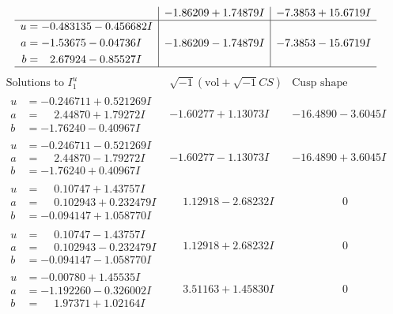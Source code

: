 \documentclass[1p]{elsarticle_modified}
\theoremstyle{definition}
\newcommand{\I}{\sqrt{-1}}
\begin{document}
$$\begin{array}{c|c|c}
 & -1.86209 + 1.74879 I & -7.3853 + 15.6719 I \\ \hline\begin{aligned}
u &= -0.483135 - 0.456682 I \\
a &= -1.53675 - 0.04736 I \\
b &= \phantom{-}2.67924 - 0.85527 I\end{aligned}
 & -1.86209 - 1.74879 I & -7.3853 - 15.6719 I\\
 \hline 
 \end{array}$$\newpage$$\begin{array}{c|c|c}  
\text{Solutions to }I^u_{1}& \I (\text{vol} + \sqrt{-1}CS) & \text{Cusp shape}\\
 \hline 
\begin{aligned}
u &= -0.246711 + 0.521269 I \\
a &= \phantom{-}2.44870 + 1.79272 I \\
b &= -1.76240 - 0.40967 I\end{aligned}
 & -1.60277 + 1.13073 I & -16.4890 - 3.6045 I \\ \hline\begin{aligned}
u &= -0.246711 - 0.521269 I \\
a &= \phantom{-}2.44870 - 1.79272 I \\
b &= -1.76240 + 0.40967 I\end{aligned}
 & -1.60277 - 1.13073 I & -16.4890 + 3.6045 I \\ \hline\begin{aligned}
u &= \phantom{-}0.10747 + 1.43757 I \\
a &= \phantom{-}0.102943 + 0.232479 I \\
b &= -0.094147 + 1.058770 I\end{aligned}
 & \phantom{-}1.12918 - 2.68232 I & \phantom{-0.000000 } 0 \\ \hline\begin{aligned}
u &= \phantom{-}0.10747 - 1.43757 I \\
a &= \phantom{-}0.102943 - 0.232479 I \\
b &= -0.094147 - 1.058770 I\end{aligned}
 & \phantom{-}1.12918 + 2.68232 I & \phantom{-0.000000 } 0 \\ \hline\begin{aligned}
u &= -0.00780 + 1.45535 I \\
a &= -1.192260 - 0.326002 I \\
b &= \phantom{-}1.97371 + 1.02164 I\end{aligned}
 & \phantom{-}3.51163 + 1.45830 I & \phantom{-0.000000 } 0 \\ \hline\begin{aligned}

\end{aligned}
\end{array}$$
\end{document}
